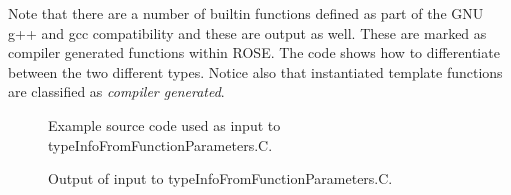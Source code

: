 Note that there are a number of builtin functions defined as part of the
GNU g++ and gcc compatibility and these are output as well.  These are
marked as compiler generated functions within ROSE.  The code shows how
to differentiate between the two different types.  Notice also that 
instantiated template functions are classified as {\em compiler generated}.


\begin{figure}[!h]
{\indent
{\mySmallFontSize


\begin{latexonly}
   
\end{latexonly}

\begin{htmlonly}
   
\end{htmlonly}

}
}
\caption{Example source code used as input to typeInfoFromFunctionParameters.C.}
\label{Tutorial:exampleInputCode_TypeInfoFromFunctionParameters}
\end{figure}

\begin{figure}[!h]
{\indent
{\mySmallFontSize


\begin{latexonly}
   
\end{latexonly}

\begin{htmlonly}
   
\end{htmlonly}

}
}
\caption{Output of input to typeInfoFromFunctionParameters.C.}
\label{Tutorial:exampleOutput_TypeInfoFromFunctionParameters}
\end{figure}



